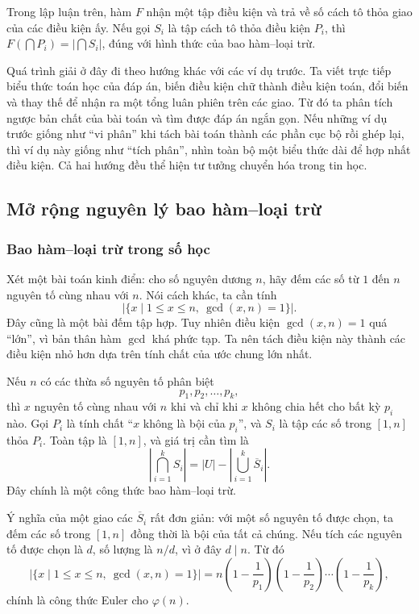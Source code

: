 \documentclass[11pt]{article}
\begin{document}
Trong lập luận trên, hàm \(F\) nhận một tập điều kiện và trả về số cách tô thỏa
giao của các điều kiện ấy. Nếu gọi \(S_i\) là tập cách tô thỏa điều kiện
\(P_i\), thì \(F(\bigcap P_i)=|\bigcap S_i|\), đúng với hình thức của bao
hàm--loại trừ.

Quá trình giải ở đây đi theo hướng khác với các ví dụ trước. Ta viết trực tiếp
biểu thức toán học của đáp án, biến điều kiện chữ thành điều kiện toán, đổi
biến và thay thế để nhận ra một tổng luân phiên trên các giao. Từ đó ta phân
tích ngược bản chất của bài toán và tìm được đáp án ngắn gọn. Nếu những ví dụ
trước giống như ``vi phân'' khi tách bài toán thành các phần cục bộ rồi ghép
lại, thì ví dụ này giống như ``tích phân'', nhìn toàn bộ một biểu thức dài để
hợp nhất điều kiện. Cả hai hướng đều thể hiện tư tưởng chuyển hóa trong tin
học.

\subsection{Mở rộng nguyên lý bao hàm--loại trừ}

\subsubsection{Bao hàm--loại trừ trong số học}

Xét một bài toán kinh điển: cho số nguyên dương \(n\), hãy đếm các số từ
\(1\) đến \(n\) nguyên tố cùng nhau với \(n\). Nói cách khác, ta cần tính
\[
  |\{x\mid 1\le x\le n,\ \gcd(x,n)=1\}|.
\]
Đây cũng là một bài đếm tập hợp. Tuy nhiên điều kiện \(\gcd(x,n)=1\) quá
``lớn'', vì bản thân hàm \(\gcd\) khá phức tạp. Ta nên tách điều kiện này
thành các điều kiện nhỏ hơn dựa trên tính chất của ước chung lớn nhất.

Nếu \(n\) có các thừa số nguyên tố phân biệt
\[
  p_1,p_2,\ldots,p_k,
\]
thì \(x\) nguyên tố cùng nhau với \(n\) khi và chỉ khi \(x\) không chia hết cho
bất kỳ \(p_i\) nào. Gọi \(P_i\) là tính chất ``\(x\) không là bội của
\(p_i\)'', và \(S_i\) là tập các số trong \([1,n]\) thỏa \(P_i\). Toàn tập là
\([1,n]\), và giá trị cần tìm là
\[
  \left|\bigcap_{i=1}^k S_i\right|
  = |U|-\left|\bigcup_{i=1}^k \overline S_i\right|.
\]
Đây chính là một công thức bao hàm--loại trừ.

Ý nghĩa của một giao các \(\overline S_i\) rất đơn giản: với một số nguyên tố
được chọn, ta đếm các số trong \([1,n]\) đồng thời là bội của tất cả chúng.
Nếu tích các nguyên tố được chọn là \(d\), số lượng là \(n/d\), vì ở đây
\(d\mid n\). Từ đó
\[
  |\{x\mid 1\le x\le n,\ \gcd(x,n)=1\}|
  = n\left(1-\frac1{p_1}\right)
      \left(1-\frac1{p_2}\right)\cdots
      \left(1-\frac1{p_k}\right),
\]
chính là công thức Euler cho \(\varphi(n)\).
\end{document}
